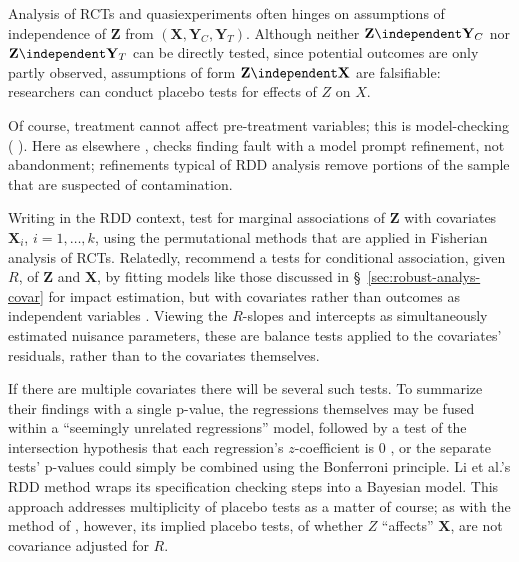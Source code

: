 Analysis of RCTs and quasiexperiments often hinges on assumptions of
independence of
 $\mathbf{Z}$ from $(\mathbf{X}, \mathbf{Y}_{C}, \mathbf{Y}_{T})$.
 Although neither $\mathbf{Z} \independent \mathbf{Y}_{C}$ nor
 $\mathbf{Z} \independent \mathbf{Y}_{T}$ can be directly tested,
 since potential outcomes are only partly observed, assumptions of form
 $\mathbf{Z} \independent \mathbf{X}$ are falsifiable: researchers can
 conduct placebo tests for effects of $Z$ on $X$.

Of course, treatment cannot affect pre-treatment variables; this is
model-checking (%
\citealp[][\S~5.13]{cox2006pos}%
).  Here as
 elsewhere \citep{box1980sab}, checks finding fault with a model prompt
 refinement, not abandonment; refinements typical of RDD analysis remove portions of
 the sample that are suspected of contamination.


 Writing in the RDD context, \citet{cattaneo2014randomization} test
 for marginal associations of $\mathbf{Z}$ with covariates $\mathbf{X}_{i}$,
 $i=1, \ldots, k$, using the permutational methods that are applied
 in Fisherian analysis of RCTs.
Relatedly, \citet{lee2010regression} recommend a
 tests for conditional association, given $R$, of $\mathbf{Z}$ and
 $\mathbf{X}$, by fitting models like those discussed in
 \S~\ref{sec:robust-analys-covar} for impact estimation, but with
 covariates rather than outcomes as independent variables%
. %
Viewing the $R$-slopes and intercepts as simultaneously estimated
 nuisance parameters, these are balance tests applied to
 the covariates' residuals, %
rather than to the covariates themselves.

If there are multiple
covariates there will be several such tests. To summarize their
findings with a single p-value, the
regressions themselves may be fused within a
``seemingly unrelated regressions'' model, followed by a test of the
intersection hypothesis that each regression's $z$-coefficient is 0
\citep{lee2010regression}, or the
separate tests' p-values could simply be combined using the Bonferroni
principle.  Li et al.'s
\citeyearpar{liMatteiMealli2015BayesianRD} RDD method wraps
its specification checking steps into a Bayesian model. %
This approach addresses multiplicity of placebo tests as a matter of course; as with the method of \citet{cattaneo2014randomization}, however, its implied placebo tests, of whether $Z$ ``affects'' $\mathbf{X}$, are not covariance adjusted for $R$.



